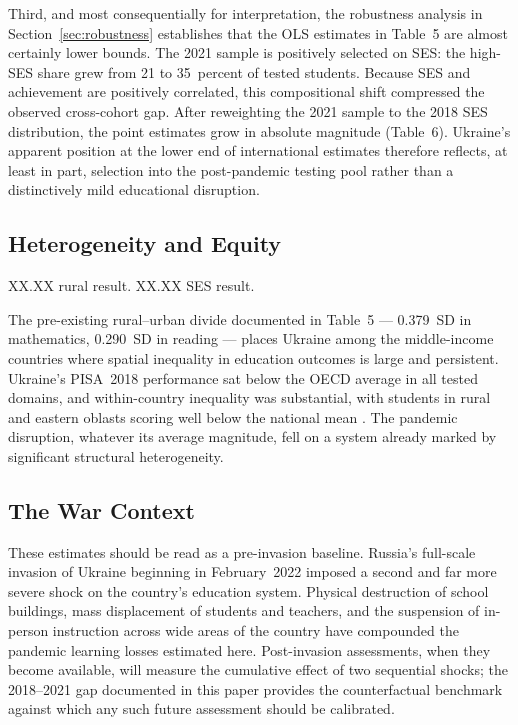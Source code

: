 Third, and most consequentially for interpretation, the robustness
analysis in Section~\ref{sec:robustness} establishes that the OLS
estimates in Table~5 are almost certainly lower bounds. The 2021 sample
is positively selected on SES: the high-SES share grew from 21 to
35~percent of tested students. Because SES and achievement are positively
correlated, this compositional shift compressed the observed cross-cohort
gap. After reweighting the 2021 sample to the 2018 SES distribution,
the point estimates grow in absolute magnitude (Table~6). Ukraine's
apparent position at the lower end of international estimates therefore
reflects, at least in part, selection into the post-pandemic testing pool
rather than a distinctively mild educational disruption.

\subsection*{Heterogeneity and Equity}

XX.XX rural result. XX.XX SES result.

The pre-existing rural--urban divide documented in Table~5 --- 0.379~SD in
mathematics, 0.290~SD in reading --- places Ukraine among the middle-income
countries where spatial inequality in education outcomes is large and
persistent. Ukraine's PISA~2018 performance sat below the OECD average
in all tested domains, and within-country inequality was substantial,
with students in rural and eastern oblasts scoring well below the
national mean \citep{oecd2019pisa}. The pandemic disruption, whatever
its average magnitude, fell on a system already marked by significant
structural heterogeneity.

\subsection*{The War Context}

These estimates should be read as a pre-invasion baseline. Russia's
full-scale invasion of Ukraine beginning in February~2022 imposed a
second and far more severe shock on the country's education system.
Physical destruction of school buildings, mass displacement of students
and teachers, and the suspension of in-person instruction across wide
areas of the country have compounded the pandemic learning losses
estimated here. Post-invasion assessments, when they become available,
will measure the cumulative effect of two sequential shocks; the
2018--2021 gap documented in this paper provides the counterfactual
benchmark against which any such future assessment should be calibrated.

